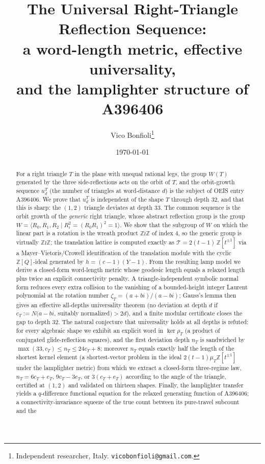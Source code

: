 \documentclass[11pt]{article}
\title{The Universal Right-Triangle Reflection Sequence:\\
a word-length metric, effective universality,\\
and the lamplighter structure of \texorpdfstring{A396406}{A396406}}
\author{Vico Bonfioli\thanks{Independent researcher, Italy.
\texttt{vicobonfioli@gmail.com}.}}
\date{\today}
\theoremstyle{plain}
\theoremstyle{definition}
\theoremstyle{remark}
\newcommand{\Z}{\mathbb{Z}}
\begin{document}
\maketitle

\begin{abstract}
For a right triangle $T$ in the plane with unequal rational legs, the
group $W(T)$ generated by the three side-reflections acts on the orbit
of $T$, and the orbit-growth sequence $u_d^T$ (the number of triangles
at word-distance $d$) is the subject of OEIS entry A396406. We prove
that $u_d^T$ is independent of the shape $T$ through depth $32$, and
that this is sharp: the $(1,2)$ triangle deviates at depth $33$. The
common sequence is the orbit growth of the \emph{generic} right
triangle, whose abstract reflection group is the group
$W=\langle R_0,R_1,R_2\mid R_i^2=(R_0R_1)^2=1\rangle$. We show that the
subgroup of $W$ on which the linear part is a rotation is the wreath
product $\Z\wr\Z$ of index $4$, so the generic group is virtually
$\Z\wr\Z$; the translation lattice is computed exactly as
$\mathcal T = 2(t-1)\,\Z[t^{\pm1}]$ via a Mayer--Vietoris/Crowell
identification of the translation module with the cyclic
$\Z[Q]$-ideal generated by $h=(c-1)(Y-1)$. From the resulting lamp
model we derive a closed-form word-length metric whose geodesic length
equals a relaxed length plus twice an explicit connectivity penalty.
A triangle-independent symbolic normal form reduces every extra
collision to the vanishing of a bounded-height integer Laurent
polynomial at the rotation number $\zeta_T=(a+bi)/(a-bi)$; Gauss's
lemma then gives an effective all-depths universality theorem (no
deviation at depth $d$ if $c_T:=N(a-bi$, suitably normalized$)>2d$),
and a finite modular certificate closes the gap to depth $32$. The
natural conjecture that universality holds at all depths is refuted:
for every algebraic shape we exhibit an explicit word in $\ker\rho_T$
(a product of conjugated glide-reflection squares), and the first
deviation depth $n_T$ is sandwiched by $\max(33,c_T)\le n_T\le 24c_T+8$;
moreover $n_T$ equals exactly half the length of the shortest kernel
element (a shortest-vector problem in the ideal $2(t-1)\mu_T\Z[t^{\pm1}]$
under the lamplighter metric) from which we extract a closed-form
three-regime law, $n_T = 6c_T+e_T$, $9c_T-3e_T$, or $3(c_T+e_T)$ according
to the angle of the triangle, certified at $(1,2)$ and validated on
thirteen shapes. Finally, the
lamplighter transfer yields a $q$-difference functional equation for
the relaxed generating function of A396406; a connectivity-invariance
squeeze of the true count between its pure-travel subcount and the

\end{abstract}
\end{document}
